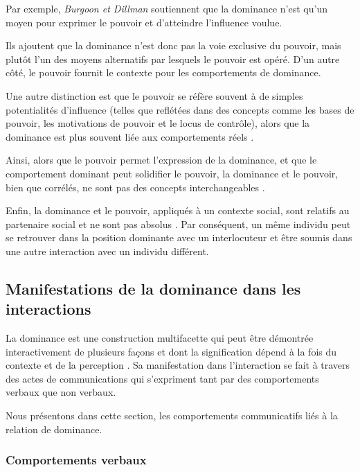 				Par exemple, \emph{Burgoon et Dillman} \cite{burgoon1995interpersonal} soutiennent que la dominance n'est qu'un moyen pour exprimer le pouvoir et d'atteindre l'influence voulue.
				
				Ils ajoutent que la dominance n'est donc pas la voie exclusive du pouvoir, mais plutôt l'un des moyens alternatifs par lesquels le pouvoir est opéré. D'un autre côté, le pouvoir fournit le contexte pour les comportements de dominance. %
				
				Une autre distinction est que le pouvoir se réfère souvent à de simples potentialités d'influence (telles que reflétées dans des concepts comme les bases de pouvoir, les motivations de pouvoir et le locus de contrôle),   alors que la dominance est plus souvent liée aux comportements réels \cite{dunbar2005perceptions,burgoon1998nature}. 
				
				Ainsi, alors que le pouvoir permet l'expression de la dominance, et que le comportement dominant peut solidifier le pouvoir, la dominance et le pouvoir, bien que corrélés, ne sont pas des concepts interchangeables \cite{burgoon1995interpersonal}.
				
				Enfin, la dominance et le pouvoir, appliqués à un contexte social, sont relatifs au partenaire social et ne sont pas absolus \cite{dunbar2005perceptions}. Par conséquent, un même individu peut se retrouver dans la position dominante avec un interlocuteur et être soumis dans une autre interaction avec un individu différent.
		
			
			
		\subsection{Manifestations de la dominance dans les interactions}
		\label{sec:manifesationDom}
		La dominance est une construction multifacette qui peut être démontrée interactivement de plusieurs façons et dont la signification dépend à la fois du contexte et de la perception \cite{dunbar2005perceptions}. Sa manifestation dans l'interaction se fait à travers des actes de communications qui s'expriment tant par des comportements verbaux que non verbaux.
		
		Nous présentons dans cette section, les comportements communicatifs liés à la relation de dominance. 
		
		\subsubsection{Comportements verbaux}
		
